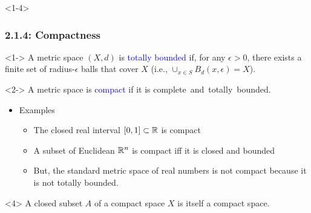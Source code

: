 \documentclass[10pt,english,aspectratio=169]{beamer}
\begin{document}
\begin{frame}<1-4>
\frametitle{2.1.4: Compactness}

\begin{definition}<1->
A metric space $(X,d)$ is \textcolor{blue}{totally bounded} if, for any $\epsilon > 0$, there exists a finite set of radius-$\epsilon$ balls that cover $X$ (i.e., $\cup_{x\in S} B_d (x,\epsilon) = X$).
\end{definition}

\begin{definition}<2->
A metric space is \textcolor{blue}{compact} if it is complete~and~totally~bounded.
\end{definition}

\begin{itemize}
\setlength\itemsep{3mm}
\item<3-> Examples \vspace{1mm}
\begin{itemize} 
  \setlength\itemsep{1.5mm}
  \item The closed real interval $[0,1]\subset \mathbb{R}$ is compact
  \item A subset of Euclidean $\mathbb{R}^n$ is compact iff it is closed and bounded
  \item But, the standard metric space of real numbers is not compact because it is not totally bounded.
\end{itemize}

\end{itemize}

\begin{theorem}<4>
A closed subset $A$ of a compact space $X$ is itself a compact space.
\end{theorem}


\end{frame}
\end{document}
